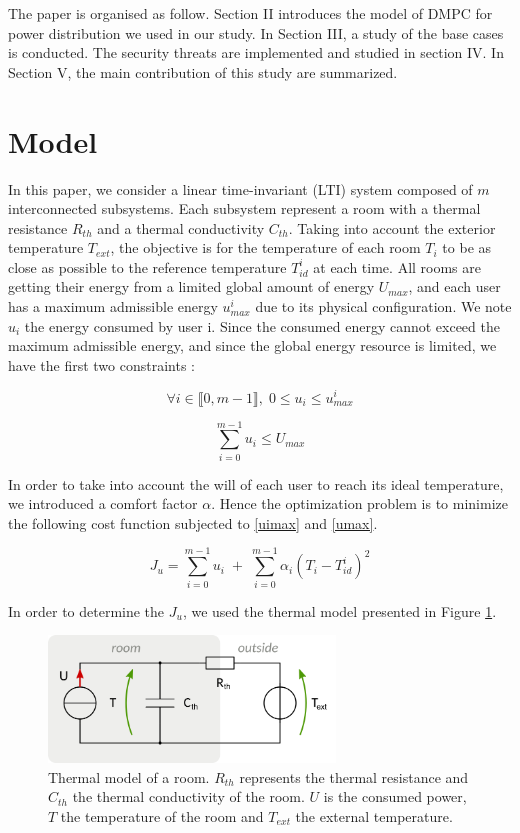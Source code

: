\documentclass[conference]{IEEEtran}
\begin{document}
The paper is organised as follow.  Section II introduces the model of DMPC for power distribution  we used in our study. In Section III,  a study of the base cases is conducted. The security threats are implemented and studied in section IV. In Section V, the main contribution of this study are summarized. 


\section{Model}
In this paper, we consider a linear time-invariant (LTI) system composed of $m$ interconnected subsystems. Each subsystem represent a room with a thermal resistance $R_{th}$ and a thermal conductivity $C_{th}$. Taking into account the exterior temperature $T_{ext}$, the objective is for the temperature of each room $T_i$ to be as close as possible to the reference temperature $T_{id}^i$ at each time. All rooms are getting their energy from a limited global amount of energy $U_{max}$, and each user has a maximum  admissible energy $u_{max}^i$ due to its physical configuration. We note $u_i$ the energy consumed by user i. Since the consumed energy cannot exceed the maximum admissible energy, and since the global energy resource is limited, we have the first two constraints :

\begin{equation}
\forall i \in \llbracket 0, m-1 \rrbracket, \; 0 \leq  u_i \leq  u_{max}^i 
\label{uimax}
\end{equation}

\begin{equation}
\sum_{i = 0}^{m-1} u_i \leq U_{max}
\label{umax}
\end{equation}

In order to take into account the will of each user to reach its ideal temperature, we introduced a comfort factor $\alpha$.  Hence the optimization problem is to minimize the following cost function subjected to \ref{uimax} and \ref{umax}. 

\begin{equation}
J_u = \sum_{i = 0}^{m-1} u_i  \; + \; \sum_{i = 0}^{m-1} \alpha_i (T_i - T_{id}^i)^2 
\label{cost}
\end{equation}

In order to determine the $J_u$, we used the thermal model presented in Figure \ref{thermmod}.

\begin{figure}[!t]
\centering
\includegraphics[width=3in]{therm_diagram.png}
\caption{Thermal model of a room. $R_{th}$ represents the thermal resistance and $C_{th}$ the thermal conductivity of the room. $U$ is the consumed power, $T$ the temperature of the room and $T_{ext}$ the external temperature.}
\label{thermmod}
\end{figure}
\end{document}
